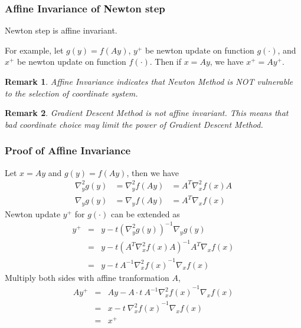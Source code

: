 \documentclass{beamer}
\newcommand{\be}{\begin{eqnarray}}
\newcommand{\ee}{\end{eqnarray}}
\newtheorem{remark}{Remark}
\begin{document}
\newcommand{\gradient}[3]{\ensuremath{\nabla_{#1} #2 (#3)}}
\newcommand{\hessian}[3]{\ensuremath{\nabla^2_{#1} #2 (#3)}}
\begin{frame}
\frametitle{Affine Invariance of Newton step}
\begin{lemma}
    Newton step is affine invariant. 
\end{lemma}
For example, let $g(y) = f(Ay)$, $y^{+}$ be newton update on function
$g(\cdot)$, and 
$x^{+}$ be newton update on function $f(\cdot)$. 
Then if $x=Ay$, we have $x^{+} = Ay^{+}$.
\begin{remark}
    Affine Invariance indicates that Newton Method is NOT vulnerable to the
    selection of coordinate system. 
\end{remark}
\begin{remark}
    Gradient Descent Method is not affine invariant. This means
    that bad coordinate choice may limit the power of Gradient Descent Method.
\end{remark}
\end{frame}
\begin{frame}
\frametitle{Proof of Affine Invariance}
    Let $x = Ay$ and $g(y) = f(Ay)$, then we have
    \be
    \hessian{y}{g}{y} &= \hessian{y}{f}{Ay} &= A^T \hessian{x}{f}{x} A \\
    \gradient{y}{g}{y} &= \gradient{y}{f}{Ay} &= A^T \gradient{x}{f}{x}
    \ee
    Newton update $y^{+}$ for $g(\cdot)$ can be extended as
    \be
    y^{+} &=& y - t(\hessian{y}{g}{y})^{-1} \gradient{y}{g}{y} \\
    &=& y - t(A^T \hessian{x}{f}{x} A)^{-1} A^T \gradient{x}{f}{x} \\
    &=& y - t\ A^{-1} \hessian{x}{f}{x}^{-1} \gradient{x}{f}{x}
    \ee
    Multiply both sides with affine tranformation $A$, 
    \be
    Ay^{+} &=& Ay - A \cdot t\ A^{-1} \hessian{x}{f}{x}^{-1} \gradient{x}{f}{x} \\
    &=& x - t\ \hessian{x}{f}{x}^{-1} \gradient{x}{f}{x} \\
    &=& x^{+}
    \ee
\end{frame}
\end{document}
